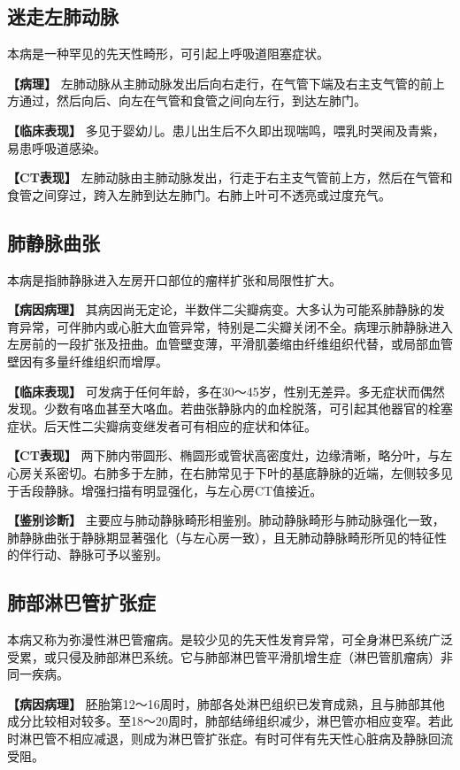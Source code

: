 \subsection{迷走左肺动脉}

本病是一种罕见的先天性畸形，可引起上呼吸道阻塞症状。

\textbf{【病理】}
左肺动脉从主肺动脉发出后向右走行，在气管下端及右主支气管的前上方通过，然后向后、向左在气管和食管之间向左行，到达左肺门。

\textbf{【临床表现】}
多见于婴幼儿。患儿出生后不久即出现喘鸣，喂乳时哭闹及青紫，易患呼吸道感染。

\textbf{【CT表现】}
左肺动脉由主肺动脉发出，行走于右主支气管前上方，然后在气管和食管之间穿过，跨入左肺到达左肺门。右肺上叶可不透亮或过度充气。

\subsection{肺静脉曲张}

本病是指肺静脉进入左房开口部位的瘤样扩张和局限性扩大。

\textbf{【病因病理】}
其病因尚无定论，半数伴二尖瓣病变。大多认为可能系肺静脉的发育异常，可伴肺内或心脏大血管异常，特别是二尖瓣关闭不全。病理示肺静脉进入左房前的一段扩张及扭曲。血管壁变薄，平滑肌萎缩由纤维组织代替，或局部血管壁因有多量纤维组织而增厚。

\textbf{【临床表现】}
可发病于任何年龄，多在30～45岁，性别无差异。多无症状而偶然发现。少数有咯血甚至大咯血。若曲张静脉内的血栓脱落，可引起其他器官的栓塞症状。后天性二尖瓣病变继发者可有相应的症状和体征。

\textbf{【CT表现】}
两下肺内带圆形、椭圆形或管状高密度灶，边缘清晰，略分叶，与左心房关系密切。右肺多于左肺，在右肺常见于下叶的基底静脉的近端，左侧较多见于舌段静脉。增强扫描有明显强化，与左心房CT值接近。

\textbf{【鉴别诊断】}
主要应与肺动静脉畸形相鉴别。肺动静脉畸形与肺动脉强化一致，肺静脉曲张于静脉期显著强化（与左心房一致），且无肺动静脉畸形所见的特征性的伴行动、静脉可予以鉴别。

\subsection{肺部淋巴管扩张症}

本病又称为弥漫性淋巴管瘤病。是较少见的先天性发育异常，可全身淋巴系统广泛受累，或只侵及肺部淋巴系统。它与肺部淋巴管平滑肌增生症（淋巴管肌瘤病）非同一疾病。

\textbf{【病因病理】}
胚胎第12～16周时，肺部各处淋巴组织已发育成熟，且与肺部其他成分比较相对较多。至18～20周时，肺部结缔组织减少，淋巴管亦相应变窄。若此时淋巴管不相应减退，则成为淋巴管扩张症。有时可伴有先天性心脏病及静脉回流受阻。

